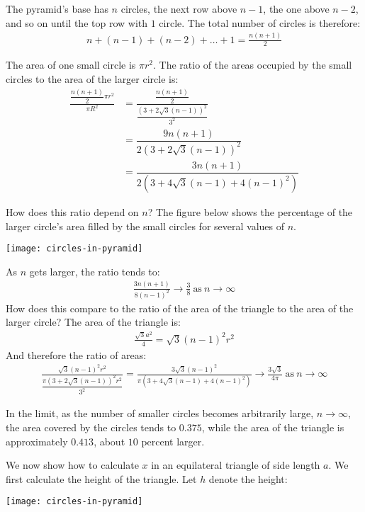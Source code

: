 \documentclass[12pt]{article}
\begin{document}
\begin{answer}
The pyramid's base has $n$ circles, the next row above $n-1$, the one above $n-2$, and so on until the top row with $1$ circle. The total number of circles is therefore:
\begin{align*}
n + (n-1) + (n-2) + \ldots + 1
  = \frac{n(n+1)}{2}
\end{align*}

The area of one small circle is $\pi r^2$. The ratio of the areas occupied by the small circles to the area of the larger circle is:
\begin{align*}
\frac{\dfrac{n(n+1)}{2} \pi r^2}{\pi R^2}
 & = 
\frac{\dfrac{n(n+1)}{2}}{\dfrac{\left(3+2\sqrt{3}(n-1)\right)^2}{3^2}}\\[1em]
 & = 
\dfrac{9n(n+1)}{2\left(3+2\sqrt{3}(n-1)\right)^2}\\[1em]
 & = 
\dfrac{3n(n+1)}{2\left(3+4\sqrt{3}(n-1)+4(n-1)^2\right)}
\end{align*}

How does this ratio depend on $n$? The figure below shows the percentage of the larger circle's area filled by the small circles for several values of $n$. 
\begin{center}
\texttt{[image: circles-in-pyramid]}
\end{center}
As $n$ gets larger, the ratio tends to:
\begin{align*}
\frac{3n(n+1)}{8(n-1)^2} \rightarrow \frac{3}{8}
~\text{as}~n\rightarrow\infty
\end{align*}
How does this compare to the ratio of the area of the triangle to the area of the larger circle? The area of the triangle is:
\begin{align*}
\frac{\sqrt{3}a^2}{4}
  = \sqrt{3}(n-1)^2r^2
\end{align*}
And therefore the ratio of areas:
\begin{align*}
\frac{\sqrt{3}(n-1)^2r^2}{\dfrac{\pi\left(3+2\sqrt{3}(n-1)\right)^2r^2}{3^2}}
= \frac{3\sqrt{3}(n-1)^2}{\pi\left(3+4\sqrt{3}(n-1)+4(n-1)^2\right)}
\rightarrow \frac{3\sqrt{3}}{4\pi}~\text{as}~n\rightarrow\infty
\end{align*}

In the limit, as the number of smaller circles becomes arbitrarily large, $n\rightarrow\infty$, the area covered by the circles tends to $0.375$, while the area of the triangle is approximately $0.413$, about $10$ percent larger. 

We now show how to calculate $x$ in an equilateral triangle of side length $a$. We first calculate the height of the triangle. Let $h$ denote the height:
\begin{center}
\texttt{[image: circles-in-pyramid]}
\end{center}


\end{answer}
\end{document}
